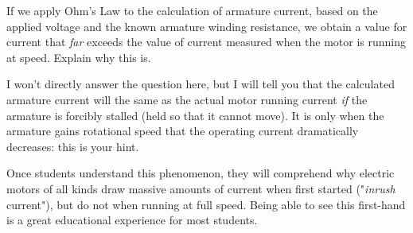 

If we apply Ohm's Law to the calculation of armature current, based on the applied voltage and the known armature winding resistance, we obtain a value for current that {\it far} exceeds the value of current measured when the motor is running at speed.  Explain why this is.







I won't directly answer the question here, but I will tell you that the calculated armature current will the same as the actual motor running current {\it if} the armature is forcibly stalled (held so that it cannot move).  It is only when the armature gains rotational speed that the operating current dramatically decreases: this is your hint.







Once students understand this phenomenon, they will comprehend why electric motors of all kinds draw massive amounts of current when first started ("{\it inrush} current"), but do not when running at full speed.  Being able to see this first-hand is a great educational experience for most students.



